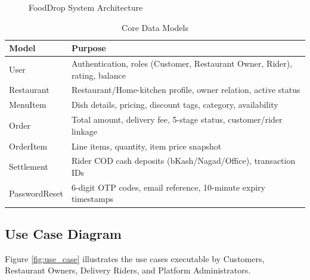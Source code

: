 \documentclass[12pt,a4paper]{report}
\begin{document}
\begin{figure}[h!]
    \caption{FoodDrop System Architecture}
    \label{fig:architecture}
\end{figure}

\begin{table}[h!]
\centering
\caption{Core Data Models}
\label{tab:data_models}
\begin{tabular}{|l|p{11cm}|}
\hline
\textbf{Model} & \textbf{Purpose} \\
\hline
User & Authentication, roles (Customer, Restaurant Owner, Rider), rating, balance \\
\hline
Restaurant & Restaurant/Home-kitchen profile, owner relation, active status \\
\hline
MenuItem & Dish details, pricing, discount tags, category, availability \\
\hline
Order & Total amount, delivery fee, 5-stage status, customer/rider linkage \\
\hline
OrderItem & Line items, quantity, item price snapshot \\
\hline
Settlement & Rider COD cash deposits (bKash/Nagad/Office), transaction IDs \\
\hline
PasswordReset & 6-digit OTP codes, email reference, 10-minute expiry timestamps \\
\hline
\end{tabular}
\end{table}

\newpage

\subsection{Use Case Diagram}
Figure \ref{fig:use_case} illustrates the use cases executable by Customers, Restaurant Owners, Delivery Riders, and Platform Administrators.
\end{document}
